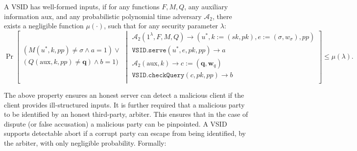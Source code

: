 \begin{definition}\label{deff::VSID-Inputs-Well-formedess}  A  VSID  has  well-formed inputs,   if for any  functions $F,M,Q$,  any auxiliary information $\text{aux}$, and  any probabilistic polynomial time adversary $\mathcal{A}_{\scriptscriptstyle 2}$, there exists a negligible function $\mu(\cdot)$, such that for any security parameter $\lambda$: 
\small{
$$ \Pr\left[
  \begin{array}{l}
  (M(u^{\scriptscriptstyle *},k,{pp})\neq \sigma \wedge a=1) \vee\\ (Q(\text{aux},k,{pp})\neq \bm{q}) \wedge  b=1)\\
\end{array} \middle |
    \begin{array}{l}
    
    \mathcal{A}_{\scriptscriptstyle 2}(1^{\scriptscriptstyle\lambda},F,M,Q)\rightarrow (u^{\scriptscriptstyle *},k:=(sk,pk),e:=(\sigma,w_{\sigma}),{pp})\\
    \mathtt{VSID.serve}(u^{\scriptscriptstyle *},e,pk,{pp})\rightarrow a\\
       \mathcal{A}_{\scriptscriptstyle 2}(\text{aux},k)\rightarrow c:=(\bm{q},\bm{w}_{\scriptscriptstyle q})\\
    \mathtt{VSID.checkQuery}(c, pk,{pp})\rightarrow b\\
\end{array}    \right]\leq \mu(\lambda).$$
}

\end{definition}

The   above property ensures an honest server can detect  a malicious client if the client provides ill-structured inputs. It is further required that a malicious party to be identified by an honest third-party, arbiter. This ensures that in the case of dispute (or false accusation) a malicious party can be pinpointed. A VSID supports  detectable abort if a corrupt party can escape from being identified, by the arbiter,  with only negligible probability.  Formally:


